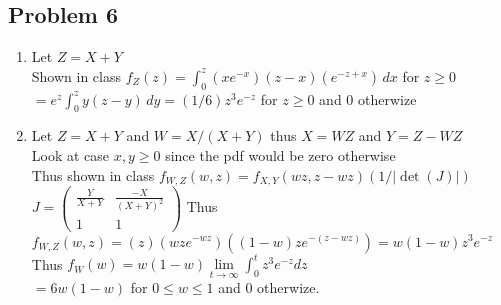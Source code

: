 \documentclass[12pt, letterpaper]{article}
\theoremstyle{definition}
\begin{document}
\newpage
\subsection*{Problem 6}
\begin{enumerate}
    \item Let $Z=X+Y$\\
    Shown in class $f_Z(z)=\displaystyle\int_0^z(xe^{-x})(z-x)(e^{-z+x})\,dx$ for $z \geq 0$\\
    $=e^z\displaystyle\int_0^zy(z-y)\, dy=(1/6)z^3e^{-z}$ for $z \geq 0$ and 0 otherwize
    \item Let $Z=X+Y$ and $W=X/(X+Y)$ thus $X=WZ$ and $Y=Z-WZ$\\
    Look at case $x,y \geq 0$ since the pdf would be zero otherwise\\
    Thus shown in class $f_{W,Z}(w,z)=f_{X,Y}(wz,z-wz)(1/|\det(J)|)$\\
    $J=\begin{pmatrix}
        \frac{Y}{X+Y} & \frac{-X}{(X+Y)^2}\\
        1 & 1
    \end{pmatrix}$
    Thus $f_{W,Z}(w,z)=(z)(wze^{-wz})((1-w)ze^{-(z-wz)})=w(1-w)z^3e^{-z}$\\
    Thus $f_W(w)=w(1-w)\lim\limits_{t \rightarrow \infty}\displaystyle\int_0^tz^3e^{-z}dz$\\
    $=6w(1-w)$ for $0 \leq w \leq 1$ and 0 otherwize.
\end{enumerate}
\end{document}
